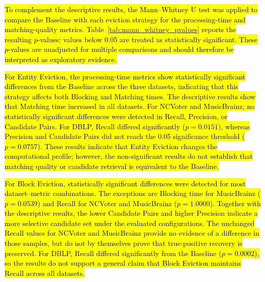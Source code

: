 \documentclass{ieeeaccess}
\begin{document}
\hl{To complement the descriptive results, the Mann--Whitney U test was applied to compare the Baseline with each eviction strategy for the processing-time and matching-quality metrics. Table~\ref{tab:mann_whitney_pvalues} reports the resulting $p$-values; values below 0.05 are treated as statistically significant. These $p$-values are unadjusted for multiple comparisons and should therefore be interpreted as exploratory evidence.}

\hl{For Entity Eviction, the processing-time metrics show statistically significant differences from the Baseline across the three datasets, indicating that this strategy affects both Blocking and Matching times. The descriptive results show that Matching time increased in all datasets. For NCVoter and MusicBrainz, no statistically significant differences were detected in Recall, Precision, or Candidate Pairs. For DBLP, Recall differed significantly ($p=0.0151$), whereas Precision and Candidate Pairs did not reach the 0.05 significance threshold ($p=0.0757$). These results indicate that Entity Eviction changes the computational profile; however, the non-significant results do not establish that matching quality or candidate retrieval is equivalent to the Baseline.}

\hl{For Block Eviction, statistically significant differences were detected for most dataset--metric combinations. The exceptions are Blocking time for MusicBrainz ($p=0.0539$) and Recall for NCVoter and MusicBrainz ($p=1.0000$). Together with the descriptive results, the lower Candidate Pairs and higher Precision indicate a more selective candidate set under the evaluated configurations. The unchanged Recall values for NCVoter and MusicBrainz provide no evidence of a difference in those samples, but do not by themselves prove that true-positive recovery is preserved. For DBLP, Recall differed significantly from the Baseline ($p=0.0002$), so the results do not support a general claim that Block Eviction maintains Recall across all datasets.}
\end{document}
